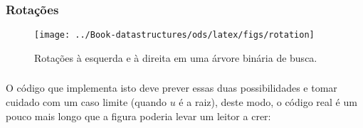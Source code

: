 \documentclass{beamer}
\newcommand{\figlabel}[1]{\label{fig:#1}}
\begin{document}
\begin{frame}[shrink]
\frametitle{Rotações}
\begin{figure}
  \begin{center}
     \texttt{[image: ../Book-datastructures/ods/latex/figs/rotation]}
  \end{center}
  \caption{Rotações à esquerda e à direita em uma árvore binária de busca.}
  \figlabel{rotations}
\end{figure}
\end{frame}

\begin{frame}
\frametitle{}
O código que implementa isto deve prever essas duas possibilidades e
tomar cuidado com um caso limite (quando $u$ é a raiz), deste modo, o código real
é um pouco mais longo que a figura poderia levar um leitor a crer:
\end{frame}
\end{document}

